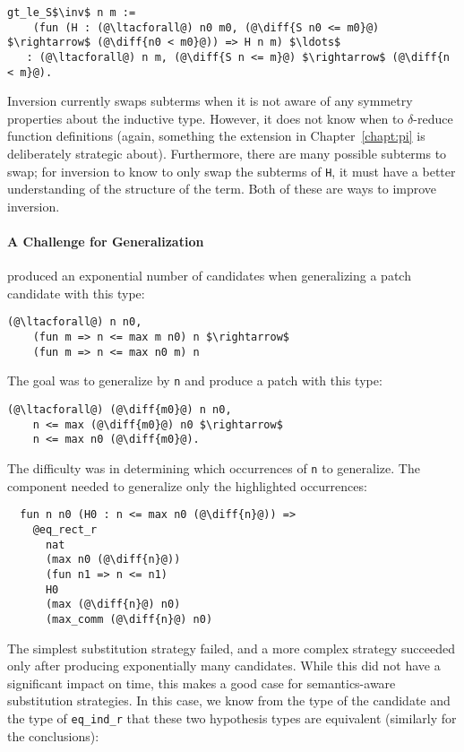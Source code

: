\begin{lstlisting}[language=coq]
  gt_le_S$\inv$ n m :=
    (fun (H : (@\ltacforall@) n0 m0, (@\diff{S n0 <= m0}@) $\rightarrow$ (@\diff{n0 < m0}@)) => H n m) $\ldots$
   : (@\ltacforall@) n m, (@\diff{S n <= m}@) $\rightarrow$ (@\diff{n < m}@).
\end{lstlisting}

Inversion currently swaps subterms when it is not
aware of any symmetry properties about the inductive type. However,
it does not know when to $\delta$-reduce function definitions (again, something the \toolnamec extension in Chapter~\ref{chapt:pi} is deliberately strategic about). Furthermore, 
there are many possible subterms to swap;
for inversion to know to only swap the subterms of \lstinline{H}, it must have a better
understanding of the structure of the term. Both of these are ways to improve inversion.

\paragraph{A Challenge for Generalization}  produced an exponential number of candidates when generalizing a patch candidate with this type:

\begin{lstlisting}[language=coq]
  (@\ltacforall@) n n0,
    (fun m => n <= max m n0) n $\rightarrow$
    (fun m => n <= max n0 m) n
\end{lstlisting}
The goal was to generalize by \lstinline{n} and produce a patch with this type:

\begin{lstlisting}[language=coq]
  (@\ltacforall@) (@\diff{m0}@) n n0,
    n <= max (@\diff{m0}@) n0 $\rightarrow$
    n <= max n0 (@\diff{m0}@).
\end{lstlisting}
The difficulty was in determining which occurrences of \lstinline{n} to generalize.
The component needed to generalize only the highlighted occurrences:

\begin{lstlisting}
  fun n n0 (H0 : n <= max n0 (@\diff{n}@)) =>
    @eq_rect_r
      nat
      (max n0 (@\diff{n}@))
      (fun n1 => n <= n1)
      H0
      (max (@\diff{n}@) n0)
      (max_comm (@\diff{n}@) n0)
\end{lstlisting}
The simplest substitution strategy failed, and a more
complex strategy
succeeded only after producing exponentially many candidates.
While this did not have a significant impact on time,
this makes a good case for semantics-aware substitution strategies.
In this case, we know from the type of the candidate
and the type of \lstinline{eq_ind_r} that these two hypothesis types 
are equivalent (similarly for the conclusions):

